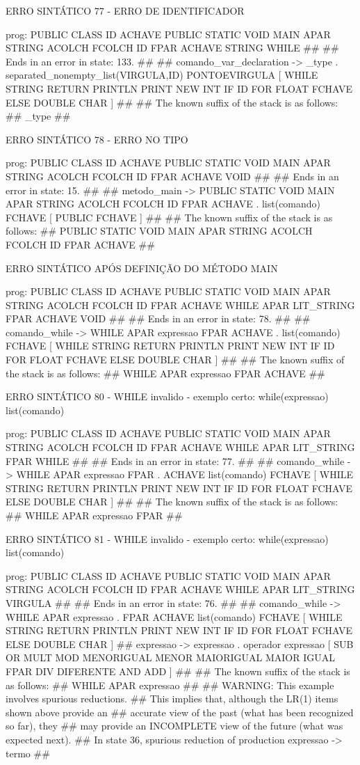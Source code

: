\documentclass[12pt,a4paper,twoside]{report}
\begin{document}
\begin{terminal}
{ERRO SINTÁTICO 77 - ERRO DE IDENTIFICADOR

prog: PUBLIC CLASS ID ACHAVE PUBLIC STATIC VOID MAIN APAR STRING ACOLCH FCOLCH ID FPAR ACHAVE STRING WHILE 
##
## Ends in an error in state: 133.
##
## comando_var_declaration -> _type . separated_nonempty_list(VIRGULA,ID) PONTOEVIRGULA [ WHILE STRING RETURN PRINTLN PRINT NEW INT IF ID FOR FLOAT FCHAVE ELSE DOUBLE CHAR ]
##
## The known suffix of the stack is as follows:
## _type 
##

ERRO SINTÁTICO 78 - ERRO NO TIPO

prog: PUBLIC CLASS ID ACHAVE PUBLIC STATIC VOID MAIN APAR STRING ACOLCH FCOLCH ID FPAR ACHAVE VOID 
##
## Ends in an error in state: 15.
##
## metodo_main -> PUBLIC STATIC VOID MAIN APAR STRING ACOLCH FCOLCH ID FPAR ACHAVE . list(comando) FCHAVE [ PUBLIC FCHAVE ]
##
## The known suffix of the stack is as follows:
## PUBLIC STATIC VOID MAIN APAR STRING ACOLCH FCOLCH ID FPAR ACHAVE 
##

ERRO SINTÁTICO APÓS DEFINIÇÃO DO MÉTODO MAIN 

prog: PUBLIC CLASS ID ACHAVE PUBLIC STATIC VOID MAIN APAR STRING ACOLCH FCOLCH ID FPAR ACHAVE WHILE APAR LIT_STRING FPAR ACHAVE VOID 
##
## Ends in an error in state: 78.
##
## comando_while -> WHILE APAR expressao FPAR ACHAVE . list(comando) FCHAVE [ WHILE STRING RETURN PRINTLN PRINT NEW INT IF ID FOR FLOAT FCHAVE ELSE DOUBLE CHAR ]
##
## The known suffix of the stack is as follows:
## WHILE APAR expressao FPAR ACHAVE 
##

ERRO SINTÁTICO 80 - WHILE invalido - exemplo certo: while(expressao){ list(comando)}

prog: PUBLIC CLASS ID ACHAVE PUBLIC STATIC VOID MAIN APAR STRING ACOLCH FCOLCH ID FPAR ACHAVE WHILE APAR LIT_STRING FPAR WHILE 
##
## Ends in an error in state: 77.
##
## comando_while -> WHILE APAR expressao FPAR . ACHAVE list(comando) FCHAVE [ WHILE STRING RETURN PRINTLN PRINT NEW INT IF ID FOR FLOAT FCHAVE ELSE DOUBLE CHAR ]
##
## The known suffix of the stack is as follows:
## WHILE APAR expressao FPAR 
##

ERRO SINTÁTICO 81 - WHILE invalido - exemplo certo: while(expressao){ list(comando)}

prog: PUBLIC CLASS ID ACHAVE PUBLIC STATIC VOID MAIN APAR STRING ACOLCH FCOLCH ID FPAR ACHAVE WHILE APAR LIT_STRING VIRGULA 
##
## Ends in an error in state: 76.
##
## comando_while -> WHILE APAR expressao . FPAR ACHAVE list(comando) FCHAVE [ WHILE STRING RETURN PRINTLN PRINT NEW INT IF ID FOR FLOAT FCHAVE ELSE DOUBLE CHAR ]
## expressao -> expressao . operador expressao [ SUB OR MULT MOD MENORIGUAL MENOR MAIORIGUAL MAIOR IGUAL FPAR DIV DIFERENTE AND ADD ]
##
## The known suffix of the stack is as follows:
## WHILE APAR expressao 
##
## WARNING: This example involves spurious reductions.
## This implies that, although the LR(1) items shown above provide an
## accurate view of the past (what has been recognized so far), they
## may provide an INCOMPLETE view of the future (what was expected next).
## In state 36, spurious reduction of production expressao -> termo 
##

}
\end{terminal}
\end{document}
